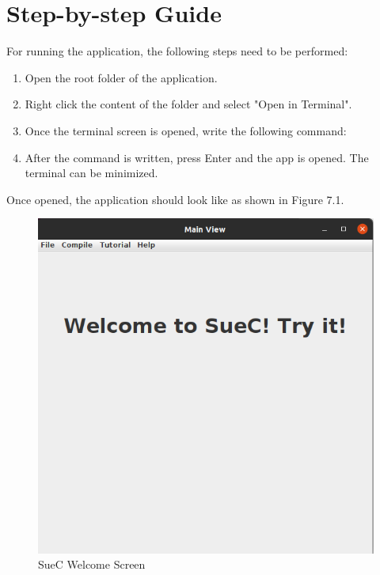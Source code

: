 \documentclass[12pt,a4paper,twoside]{report}
\begin{document}
\section{Step-by-step Guide}
	For running the application, the following steps need to be performed:
	\begin{enumerate}
	\item Open the root folder of the application.
	\item Right click the content of the folder and select "Open in Terminal".
	\item Once the terminal screen is opened, write the following command: 
	
	\item After the command is written, press Enter and the app is opened. The terminal can be minimized.
	\end{enumerate}
	
	Once opened, the application should look like as shown in Figure 7.1.
	
	\begin{figure}[H]
    \centering
    \includegraphics[scale=0.4]{img/userGuide/WelcomeScreen.png}
    \caption{SueC Welcome Screen}
    \label{fig:conf}
\end{figure}
\end{document}
